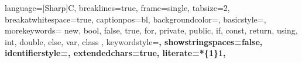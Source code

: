 
\newcommand\digitstyle{\color{smagenta}}
\newcommand\symbolstyle{\color{base01}}

\makeatletter
\newcommand{\ProcessDigit}[1]
{%
	\ifnum\lst@mode=\lst@Pmode\relax%
	{\digitstyle #1}%
	\else
	#1%
	\fi
}
\makeatother


 {
	language=[Sharp]C,
	breaklines=true,
	frame=single,
	tabsize=2,
	breakatwhitespace=true,
	captionpos=bl,
	backgroundcolor=\color{bgcolor},
	basicstyle=\footnotesize\ttfamily,
	morekeywords={
		new, bool, false, true, for, private, public, if,
		const, return, using, int, double, else, var, class
	},
	keywordstyle=\bfseries\color{sgreen},
	showstringspaces=false,
	identifierstyle=\color{sblue},
	extendedchars=true,
	literate=*{\{}{{{\color[rgb]{0.9, 0.9, 0.9}}}}1{\}}{{{\color[rgb]{0.9, 0.9, 0.9}}}}1,
}

\lstset{escapechar=@, style=solarizedcsharp}
